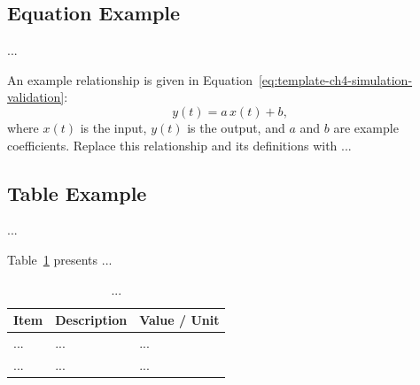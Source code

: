 \subsection{Equation Example}
...

An example relationship is given in Equation~\eqref{eq:template-ch4-simulation-validation}:
\begin{equation}
    y(t) = a\,x(t) + b,
    \label{eq:template-ch4-simulation-validation}
\end{equation}
where $x(t)$ is the input, $y(t)$ is the output, and $a$ and $b$ are
example coefficients. Replace this relationship and its definitions with ...

\subsection{Table Example}
...

Table~\ref{tab:template-ch4-simulation-validation} presents ...
\begin{table}[htbp]
    \centering
    \caption{...}
    \label{tab:template-ch4-simulation-validation}
    \begin{tabularx}{0.9\linewidth}{lXX}
        \toprule
        \textbf{Item} & \textbf{Description} & \textbf{Value / Unit} \\
        \midrule
        ... & ... & ... \\
        ... & ... & ... \\
        \bottomrule
    \end{tabularx}
\end{table}
